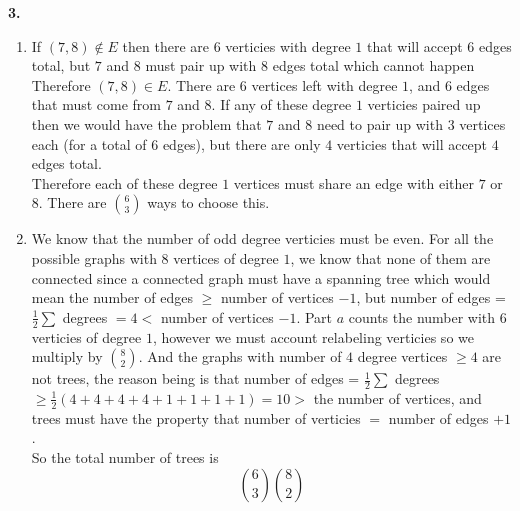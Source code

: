 \documentclass[12pt]{article}
\newenvironment{ques}{\vspace{2 ex}}{\vspace{2 ex}}
\theoremstyle{definition}
\begin{document}
\begin{ques}
	\textbf{3.}
		\begin{enumerate}
			\item
				If $(7,8) \notin E$ then there are $6$
				verticies with degree $1$ that will accept $6$
				edges total, but $7$ and $8$ must pair up with
				$8$ edges total which cannot happen\\
				Therefore $(7,8) \in E$. There
				are $6$ vertices left with degree $1$, and $6$
				edges that must come from $7$ and $8$. If any
				of these degree $1$ verticies paired up then we
				would have the problem that $7$ and $8$ need to
				pair up with $3$ vertices each (for a total of
				$6$ edges), but there are only $4$ verticies
				that will accept $4$ edges
				total.\\
				Therefore each of these degree $1$ vertices
				must share an edge with either $7$ or $8$.
				There are $\binom{6}{3}$ ways to choose this.
			\item
				We know that the number of odd degree verticies
				must be even. For all the possible graphs with $8$
				vertices of degree $1$, we know that none of
				them are connected since a connected graph must
				have a spanning tree which would mean the
				number of edges $\geq$ number of vertices $-1$,
				but number of edges = $\frac{1}{2}\sum $
				degrees $= 4 <$ number of vertices $-1$. Part
				$a$ counts the number with $6$ verticies of
				degree $1$, however we must account relabeling
				verticies so we multiply by $\binom{8}{2}$. And the
				graphs with number of $4$ degree vertices $\geq
				4$ are not trees, the reason being is that
				number of edges = $\frac{1}{2}\sum $ degrees
				$\geq \frac{1}{2}(4 + 4 + 4  + 4 + 1 + 1 + 1 +
				1) = 10 >$ the number of vertices, and trees
				must have the property that number of verticies
				$=$ number of edges $+ 1$.\\ So the total
				number of trees is $$\binom{6}{3}\binom{8}{2}$$

		\end{enumerate}
\end{ques}
\end{document}
